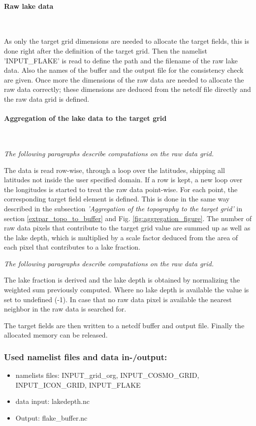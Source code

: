 \documentclass[a4paper,10pt,DIV14,BCOR1cm,titlepage,twoside]{scrartcl}
\begin{document}
\paragraph{Raw lake data}\ \par\medskip\noindent
As only the target grid dimensions are needed to allocate the target fields, this is done right after the definition of the target grid. Then the namelist 'INPUT\_FLAKE' is read to define the path and the filename of the raw lake data. Also the names of the buffer and the output file for the consistency check are given. Once more the dimensions of the raw data are needed to allocate the raw data correctly; these dimensions are deduced from the netcdf file directly and the raw data grid is defined.
\paragraph{Aggregation of the lake data to the target grid}\ \par\medskip\noindent
\textit{The following paragraphs describe computations on the raw data grid.} \par\medskip\noindent
The data is read row-wise, through a loop  over the latitudes, shipping all latitudes not inside the user specified domain. If a row is kept, a new loop over the longitudes is started to treat the raw data point-wise. For each point, the corresponding target field element is defined. This is done in the same way described in the subsection \textit{'Aggregation of the topography to the target grid'} in section \ref{extpar_topo_to_buffer} and Fig. \ref{fig:aggregation_figure}. The number of raw data pixels that contribute to the target grid value are summed up as well as the lake depth, which is multiplied by a scale factor deduced from the area of each pixel that contributes to a lake fraction. \par\medskip\noindent
\textit{The following paragraphs describe computations on the raw data grid.} \par\medskip\noindent
The lake fraction is derived and the lake depth is obtained by normalizing the weighted sum previously computed. Where no lake depth is available the value is set to undefined (-1). In case that no raw data pixel is available the nearest neighbor in the raw data is searched for. \par\medskip\noindent
The target fields are then written to a netcdf buffer and output file. Finally the allocated memory can be released.
\subsubsection{Used namelist files and data in-/output:}
\begin{itemize}
 \item namelists files: INPUT\_grid\_org, INPUT\_COSMO\_GRID, INPUT\_ICON\_GRID, INPUT\_FLAKE
 \item data input: lakedepth.nc
 \item Output: flake\_buffer.nc
\end{itemize}
\end{document}
